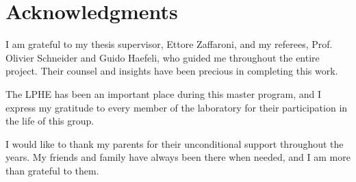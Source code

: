 

\bigskip

\begingroup
\let\clearpage\relax
\let\cleardoublepage\relax
\let\cleardoublepage\relax
\chapter*{Acknowledgments}
I am grateful to my thesis supervisor, Ettore Zaffaroni, and my referees, Prof. Olivier Schneider and Guido Haefeli, who guided me throughout the entire project. Their counsel and insights have been precious in completing this work.

The LPHE has been an important place during this master program, and I express my gratitude to every member of the laboratory for their participation in the life of this group.

I would like to thank my parents for their unconditional support throughout the years. My friends and family have always been there when needed, and I am more than grateful to them.


\endgroup



